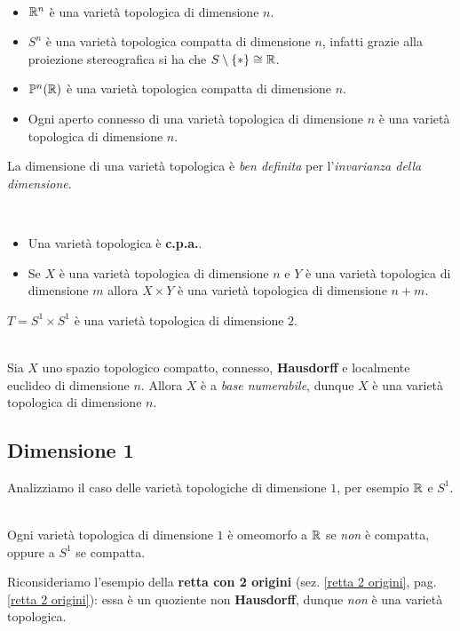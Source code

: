 \begin{examples}~{}
	\begin{itemize}
		\item $\mathbb{R}^n$ è una varietà topologica di dimensione $n$.
		\item $S^n$ è una varietà topologica compatta di dimensione $n$, infatti grazie alla proiezione stereografica si ha che $S\setminus\{*\}\cong \mathbb{R}$.
		\item $\mathbb{P}^n(\mathbb{R})$ è una varietà topologica compatta di dimensione $n$.
		\item Ogni aperto connesso di una varietà topologica di dimensione $n$ è una varietà topologica di dimensione $n$.
	\end{itemize}
\vspace{-3mm}
\end{examples}
\begin{observe}
	La dimensione di una varietà topologica è \textit{ben definita} per l'\textit{invarianza della dimensione}.
\end{observe}
\begin{observes}~{}
	\begin{itemize}
		\item Una varietà topologica è \textbf{c.p.a.}.
		\item Se $X$ è una varietà topologica di dimensione $n$ e $Y$ è una varietà topologica di dimensione $m$ allora $X\times Y$ è una varietà topologica di dimensione $n+m$.
		\vspace{-3mm}
	\end{itemize}
\end{observes}
\begin{example}
	$T=S^1\times S^1$ è una varietà topologica di dimensione $2$.
\end{example}
\begin{theorema}~{}\label{compattoconnessohausdorfflocalmenteuclideo}\\
Sia $X$ uno spazio topologico compatto, connesso, \textbf{Hausdorff} e localmente euclideo di dimensione $n$. Allora $X$ è a \textit{base numerabile}, dunque $X$ è una varietà topologica di dimensione $n$.
\end{theorema}
\subsection{Dimensione 1}
Analizziamo il caso delle varietà topologiche di dimensione $1$, per esempio $\mathbb{R}$ e $S^1$.
\begin{theorema}~{}\\
	Ogni varietà topologica di dimensione $1$ è omeomorfo a $\mathbb{R}$ se \textit{non} è compatta, oppure a $S^1$ se compatta.
\end{theorema}
\begin{example}
Riconsideriamo l'esempio della \textbf{retta con 2 origini} (sez. \ref{retta 2 origini}, pag. \ref{retta 2 origini}): essa è un quoziente non \textbf{Hausdorff}, dunque \textit{non} è una varietà topologica.
\end{example}
